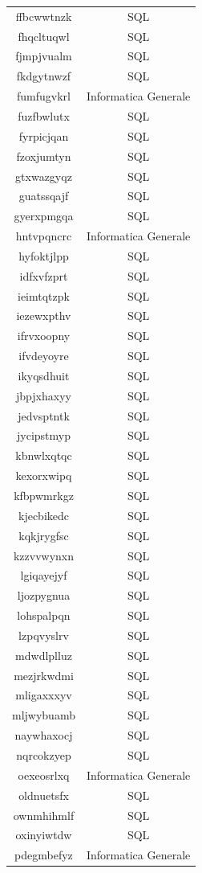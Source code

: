 \begin{longtable}{|c|c|}
ffbcwwtnzk & SQL \\
fhqcltuqwl & SQL \\
fjmpjvualm & SQL \\
fkdgytnwzf & SQL \\
fumfugvkrl & Informatica Generale \\
fuzfbwlutx & SQL \\
fyrpicjqan & SQL \\
fzoxjumtyn & SQL \\
gtxwazgyqz & SQL \\
guatssqajf & SQL \\
gyerxpmgqa & SQL \\
hntvpqncrc & Informatica Generale \\
hyfoktjlpp & SQL \\
idfxvfzprt & SQL \\
ieimtqtzpk & SQL \\
iezewxpthv & SQL \\
ifrvxoopny & SQL \\
ifvdeyoyre & SQL \\
ikyqsdhuit & SQL \\
jbpjxhaxyy & SQL \\
jedvsptntk & SQL \\
jycipstmyp & SQL \\
kbnwlxqtqc & SQL \\
kexorxwipq & SQL \\
kfbpwmrkgz & SQL \\
kjecbikedc & SQL \\
kqkjrygfsc & SQL \\
kzzvvwynxn & SQL \\
lgiqayejyf & SQL \\
ljozpygnua & SQL \\
lohspalpqn & SQL \\
lzpqvyslrv & SQL \\
mdwdlplluz & SQL \\
mezjrkwdmi & SQL \\
mligaxxxyv & SQL \\
mljwybuamb & SQL \\
naywhaxocj & SQL \\
nqrcokzyep & SQL \\
oexeosrlxq & Informatica Generale \\
oldnuetsfx & SQL \\
ownmhihmlf & SQL \\
oxinyiwtdw & SQL \\
pdegmbefyz & Informatica Generale \\

\end{longtable}

